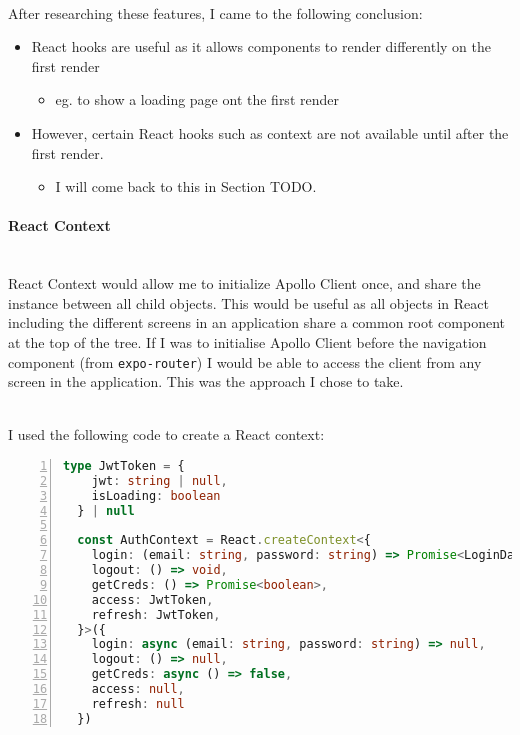\documentclass[../../main.tex]{subfiles}
\begin{document}
\noindent \\ After researching these features, I came to the following conclusion:

\begin{itemize}
  \item React hooks are useful as it allows components to render differently on the first render
        \begin{itemize}
          \item eg. to show a loading page ont the first render
        \end{itemize}
  \item However, certain React hooks such as context are not
        available until after the first render.
        \begin{itemize}
          \item I will come back to this in Section TODO.
        \end{itemize}
\end{itemize}

\paragraph{React Context}

\noindent \\ React Context would allow me to initialize Apollo Client once,
and share the instance between all child objects. This would be useful as
all objects in React including the different screens in an application share a common
root component at the top of the tree. If I was to initialise Apollo Client
before the navigation component (from \lstinline{expo-router}) I would be able to access
the client from any screen in the application. This was the approach I chose to take.

\noindent \\ I used the following code to create a React context:

\begin{lstlisting}[language=typescript, numbers=left, framesep=6pt]
  type JwtToken = {
    jwt: string | null,
    isLoading: boolean
  } | null

  const AuthContext = React.createContext<{
    login: (email: string, password: string) => Promise<LoginData | null | undefined>,
    logout: () => void,
    getCreds: () => Promise<boolean>,
    access: JwtToken,
    refresh: JwtToken,
  }>({
    login: async (email: string, password: string) => null,
    logout: () => null,
    getCreds: async () => false,
    access: null,
    refresh: null
  })
\end{lstlisting}
\end{document}

